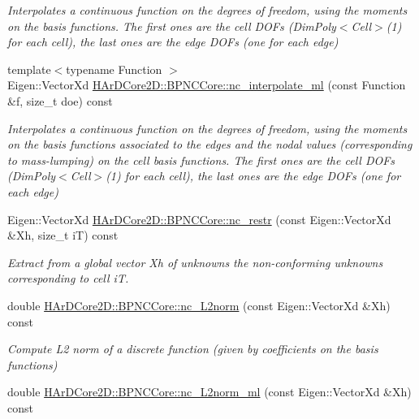 \begin{DoxyCompactItemize}
\begin{DoxyCompactList}\small\item\em Interpolates a continuous function on the degrees of freedom, using the moments on the basis functions. The first ones are the cell D\+O\+Fs (Dim\+Poly$<$\+Cell$>$(1) for each cell), the last ones are the edge D\+O\+Fs (one for each edge) \end{DoxyCompactList}\item 
{\footnotesize template$<$typename Function $>$ }\\Eigen\+::\+Vector\+Xd \hyperlink{group__BPNC_ga28d174f3526b19d85e225b9db5f9de8e}{H\+Ar\+D\+Core2\+D\+::\+B\+P\+N\+C\+Core\+::nc\+\_\+interpolate\+\_\+ml} (const Function \&f, size\+\_\+t doe) const
\begin{DoxyCompactList}\small\item\em Interpolates a continuous function on the degrees of freedom, using the moments on the basis functions associated to the edges and the nodal values (corresponding to mass-\/lumping) on the cell basis functions. The first ones are the cell D\+O\+Fs (Dim\+Poly$<$\+Cell$>$(1) for each cell), the last ones are the edge D\+O\+Fs (one for each edge) \end{DoxyCompactList}\item 
Eigen\+::\+Vector\+Xd \hyperlink{group__BPNC_gad91a640f713f2f584b9280d7740f97da}{H\+Ar\+D\+Core2\+D\+::\+B\+P\+N\+C\+Core\+::nc\+\_\+restr} (const Eigen\+::\+Vector\+Xd \&Xh, size\+\_\+t iT) const
\begin{DoxyCompactList}\small\item\em Extract from a global vector Xh of unknowns the non-\/conforming unknowns corresponding to cell iT. \end{DoxyCompactList}\item 
\mbox{\label{group__BPNC_gafd34682af893a9c13dc8f60b9f2ca532}} 
double \hyperlink{group__BPNC_gafd34682af893a9c13dc8f60b9f2ca532}{H\+Ar\+D\+Core2\+D\+::\+B\+P\+N\+C\+Core\+::nc\+\_\+\+L2norm} (const Eigen\+::\+Vector\+Xd \&Xh) const
\begin{DoxyCompactList}\small\item\em Compute L2 norm of a discrete function (given by coefficients on the basis functions) \end{DoxyCompactList}\item 
\mbox{\label{group__BPNC_gabca2e8cbf4f01cddfa96124a07526a0e}} 
double \hyperlink{group__BPNC_gabca2e8cbf4f01cddfa96124a07526a0e}{H\+Ar\+D\+Core2\+D\+::\+B\+P\+N\+C\+Core\+::nc\+\_\+\+L2norm\+\_\+ml} (const Eigen\+::\+Vector\+Xd \&Xh) const

\end{DoxyCompactItemize}
